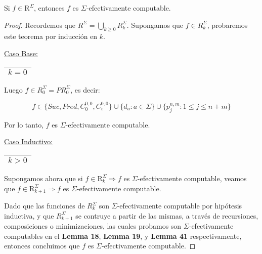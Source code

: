   \begin{theorem}
    \PN Si $f \in \mathrm{R}^{\Sigma}$, entonces $f$ es $\Sigma$-efectivamente computable.
  \end{theorem}
  \begin{proof}
    \PN Recordemos que $R^{\Sigma} = \bigcup\limits_{k \geq 0} R_{k}^{\Sigma}$. Supongamos que $f \in
    R_{k}^{\Sigma}$, probaremos este teorema por inducción en $k$.

    \vspace{3mm}
    \PN \underline{Caso Base:} \begin{tabular}{|c|} \hline $k = 0$ \\\hline \end{tabular}

    \vspace{1mm}
    \PN Luego $f \in R_{0}^{\Sigma} = PR_{0}^{\Sigma}$, es decir:

    \[
      f \in \{Suc, Pred, C_{0}^{0,0}, C_{\varepsilon}^{0,0}\} \cup \{d_{a}: a \in \Sigma\} \cup \{p_{j}^{n,m} : 1 \leq j
      \leq n+m\}
    \]

    \PN Por lo tanto, $f$ es $\Sigma$-efectivamente computable.

    \vspace{3mm}
	  \PN \underline{Caso Inductivo:} \begin{tabular}{|c|} \hline $k > 0$ \\\hline \end{tabular}

    \PN Supongamos ahora que si $f \in \mathrm{R}_{k}^{\Sigma} \Rightarrow f$ es $\Sigma$-efectivamente computable,
    veamos que $f \in \mathrm{R}_{k+1}^{\Sigma} \Rightarrow f$ es $\Sigma$-efectivamente computable.

    \PN Dado que las funciones de $R_{k}^{\Sigma}$ son $\Sigma$-efectivamente computable por hipótesis inductiva, y que
    $R_{k+1}^{\Sigma}$ se contruye a partir de las mismas, a través de recursiones, composiciones o minimizaciones,
    las cuales probamos son $\Sigma$-efectivamente computables en el \textbf{Lemma 18}, \textbf{Lemma 19}, y
    \textbf{Lemma 41} respectivamente, entonces concluimos que $f$ es $\Sigma$-efectivamente computable.
  \end{proof}

